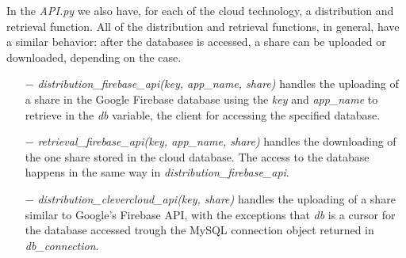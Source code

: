 \documentclass[12pt, a4paper, oneside]{book}
\begin{document}
    In the {\it API.py} we also have, for each of the cloud technology, a distribution and retrieval function. All of the distribution and retrieval functions, in general, have a similar behavior: after the databases is accessed, a share can be uploaded or downloaded, depending on the case. 
    \vspace{-0.5cm}
    \begin{itemize}
        \item[$-$] {\it distribution\_firebase\_api(key, app\_name, share)} handles the uploading of a share in the Google Firebase database using the {\it key} and {\it app\_name} to retrieve in the {\it db} variable, the client for accessing the specified database. 
    \end{itemize}
    \vspace{-0.5cm}
    \begin{itemize}
        \item[$-$] {\it retrieval\_firebase\_api(key, app\_name, share)} handles the downloading of the one share stored in the cloud database. The access to the database happens in the same way in {\it distribution\_firebase\_api}.
    \end{itemize}
    \vspace{-0.5cm}
    \begin{itemize}
        \item[$-$] {\it distribution\_clevercloud\_api(key, share)} handles the uploading of a share similar to Google's Firebase API, with the exceptions that {\it db} is a cursor for the database accessed trough the MySQL connection object returned in {\it db\_connection}.
    \end{itemize}
\end{document}
